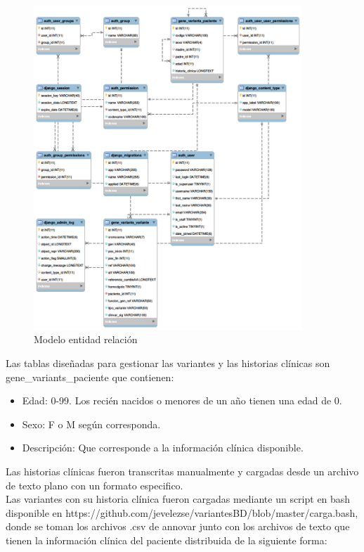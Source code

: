 \begin{figure}[H]
	\centering
	\includegraphics[width=0.9\textwidth]{Kap3/modeloEER}
	\caption{Modelo entidad relación} \label{fig:t}
\end{figure}

Las tablas diseñadas para gestionar las variantes y las historias clínicas son gene\_variants\_paciente que contienen:

\begin{itemize}
	\item Edad: 0-99. Los recién nacidos  o menores de un año tienen una edad de 0.
	\item Sexo: F o M según corresponda.
	\item Descripción: Que corresponde a la información clínica disponible.
\end{itemize} 



Las historias clínicas fueron transcritas manualmente y cargadas desde un archivo de texto plano con un formato especifico.\\

Las variantes con su historia clínica fueron cargadas mediante un script en bash disponible en https://github.com/jevelezse/variantesBD/blob/master/carga.bash, donde se toman los archivos .csv de annovar junto con los archivos de texto que tienen la información clínica del paciente distribuida de la siguiente forma:



